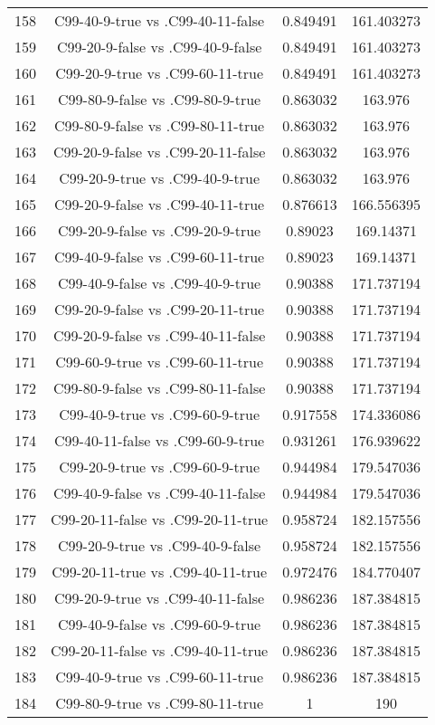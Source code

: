 \documentclass[a4paper,10pt]{article}
\begin{document}
\begin{landscape}
\begin{table}[!htp]
\begin{tabular}{cccc}
158&C99-40-9-true vs .C99-40-11-false&0.849491&161.403273\\
159&C99-20-9-false vs .C99-40-9-false&0.849491&161.403273\\
160&C99-20-9-true vs .C99-60-11-true&0.849491&161.403273\\
161&C99-80-9-false vs .C99-80-9-true&0.863032&163.976\\
162&C99-80-9-false vs .C99-80-11-true&0.863032&163.976\\
163&C99-20-9-false vs .C99-20-11-false&0.863032&163.976\\
164&C99-20-9-true vs .C99-40-9-true&0.863032&163.976\\
165&C99-20-9-false vs .C99-40-11-true&0.876613&166.556395\\
166&C99-20-9-false vs .C99-20-9-true&0.89023&169.14371\\
167&C99-40-9-false vs .C99-60-11-true&0.89023&169.14371\\
168&C99-40-9-false vs .C99-40-9-true&0.90388&171.737194\\
169&C99-20-9-false vs .C99-20-11-true&0.90388&171.737194\\
170&C99-20-9-false vs .C99-40-11-false&0.90388&171.737194\\
171&C99-60-9-true vs .C99-60-11-true&0.90388&171.737194\\
172&C99-80-9-false vs .C99-80-11-false&0.90388&171.737194\\
173&C99-40-9-true vs .C99-60-9-true&0.917558&174.336086\\
174&C99-40-11-false vs .C99-60-9-true&0.931261&176.939622\\
175&C99-20-9-true vs .C99-60-9-true&0.944984&179.547036\\
176&C99-40-9-false vs .C99-40-11-false&0.944984&179.547036\\
177&C99-20-11-false vs .C99-20-11-true&0.958724&182.157556\\
178&C99-20-9-true vs .C99-40-9-false&0.958724&182.157556\\
179&C99-20-11-true vs .C99-40-11-true&0.972476&184.770407\\
180&C99-20-9-true vs .C99-40-11-false&0.986236&187.384815\\
181&C99-40-9-false vs .C99-60-9-true&0.986236&187.384815\\
182&C99-20-11-false vs .C99-40-11-true&0.986236&187.384815\\
183&C99-40-9-true vs .C99-60-11-true&0.986236&187.384815\\
184&C99-80-9-true vs .C99-80-11-true&1&190\\

\end{tabular}
\end{table}
\end{landscape}
\end{document}
